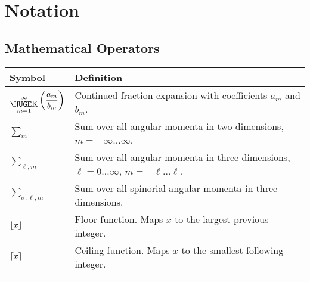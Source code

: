 \chapter*{Notation}


\section*{Mathematical Operators}
\begin{tabularx}{\textwidth}{lX}
  \hline\hline
  Symbol			& Definition	\\
  \hline\hline				
  $\displaystyle{\bigk_{m=1}^\infty\left(\frac{a_m}{b_m}\right)}$
				& Continued fraction expansion with coefficients $a_m$ and $b_m$. \\
  ${\sum_m}$			& Sum over all angular momenta in two dimensions, $m=-\infty\ldots\infty$.\\
  ${\sum_{\ell,m}}$		& Sum over all angular momenta in three dimensions, $\ell=0\ldots\infty$, $m=-\ell\ldots\ell$. \\
  ${\sum_{\sigma,\ell,m}}$	& Sum over all spinorial angular momenta in three dimensions.	\\
  $\floor*{x}$			& Floor function. Maps $x$ to the largest previous integer.	\\
  $\ceil*{x}$			& Ceiling function. Maps $x$ to the smallest following integer.	\\
  \hline\hline				\\
\end{tabularx}

